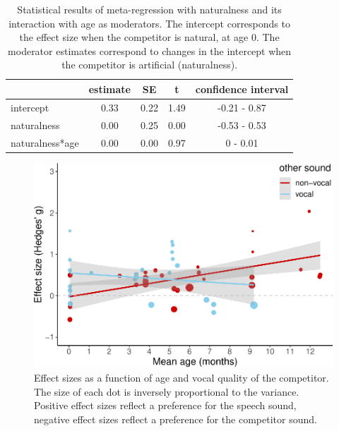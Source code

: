 \documentclass[
  english,
  man]{apa6}
\begin{document}
\begin{table}[tbp]

\begin{center}
\begin{threeparttable}

\caption{\label{tab:TableNatural}Statistical results of meta-regression with naturalness and its interaction with age as moderators. The intercept corresponds to the effect size when the competitor is natural, at age 0. The moderator estimates correspond to changes in the intercept when the competitor is artificial (naturalness).}

\begin{tabular}{lcccc}
\toprule
 & estimate & SE & t & confidence interval\\
\midrule
intercept & 0.33 & 0.22 & 1.49 & -0.21 - 0.87\\
naturalness & 0.00 & 0.25 & 0.00 & -0.53 - 0.53\\
naturalness*age & 0.00 & 0.00 & 0.97 & 0 - 0.01\\
\bottomrule
\end{tabular}

\end{threeparttable}
\end{center}

\end{table}

\begin{figure}
\centering
\includegraphics{MA_speech_pref_files/figure-latex/vocal-1.pdf}
\caption{\label{fig:vocal}Effect sizes as a function of age and vocal quality of the competitor. The size of each dot is inversely proportional to the variance. Positive effect sizes reflect a preference for the speech sound, negative effect sizes reflect a preference for the competitor sound.}
\end{figure}
\end{document}

